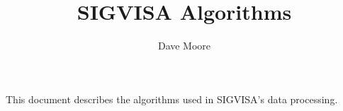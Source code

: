 \documentclass{article}
\begin{document}
\title{SIGVISA Algorithms}
\author{Dave Moore}
\date{}

This document describes the algorithms used in SIGVISA's data processing. 
\end{document}
